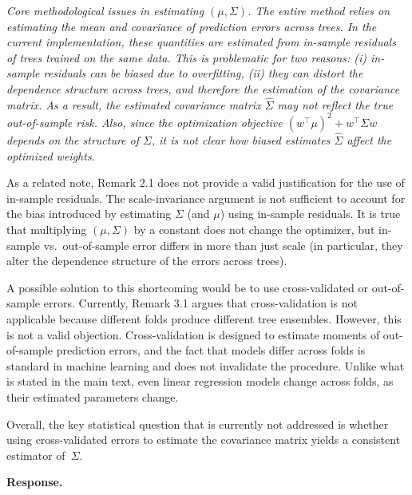 \documentclass[12pt]{article}
\newcommand{\comment}[1]{\begin{refbox}\itshape #1\end{refbox}}
\newcommand{\response}{\medskip\noindent\textbf{Response.}\ }
\begin{document}
\comment{Core methodological issues in estimating $(\mu, \Sigma)$. The entire
method relies on estimating the mean and covariance of prediction errors
across trees. In the current implementation, these quantities are estimated
from in-sample residuals of trees trained on the same data. This is
problematic for two reasons: (i) in-sample residuals can be biased due to
overfitting, (ii) they can distort the dependence structure across trees, and
therefore the estimation of the covariance matrix. As a result, the estimated
covariance matrix $\hat\Sigma$ may not reflect the true out-of-sample risk.
Also, since the optimization objective $(w^\top \mu)^2 + w^\top \Sigma w$
depends on the structure of $\Sigma$, it is not clear how biased estimates
$\hat\Sigma$ affect the optimized weights.

As a related note, Remark 2.1 does not provide a valid justification for the
use of in-sample residuals. The scale-invariance argument is not sufficient
to account for the bias introduced by estimating $\Sigma$ (and $\mu$) using
in-sample residuals. It is true that multiplying $(\mu, \Sigma)$ by a
constant does not change the optimizer, but in-sample vs.\ out-of-sample
error differs in more than just scale (in particular, they alter the
dependence structure of the errors across trees).

A possible solution to this shortcoming would be to use cross-validated or
out-of-sample errors. Currently, Remark 3.1 argues that cross-validation is
not applicable because different folds produce different tree ensembles.
However, this is not a valid objection. Cross-validation is designed to
estimate moments of out-of-sample prediction errors, and the fact that
models differ across folds is standard in machine learning and does not
invalidate the procedure. Unlike what is stated in the main text, even
linear regression models change across folds, as their estimated parameters
change.

Overall, the key statistical question that is currently not addressed is
whether using cross-validated errors to estimate the covariance matrix
yields a consistent estimator of~$\Sigma$.}

\response
\end{document}
